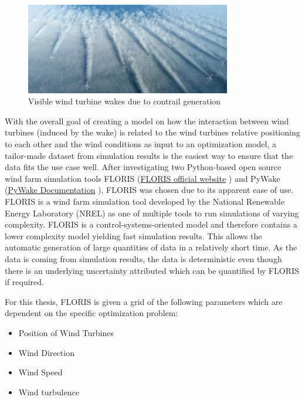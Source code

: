 \begin{figure}[h] 
	\centering
	\includegraphics[width=0.8\textwidth]{figures/introduction/wake_photo.png} 
	\caption{Visible wind turbine wakes due to contrail generation \cite{windpowermonthly_offshore_clusters}}
	\label{fig:wake_photo}
\end{figure}


With the overall goal of creating a model on how the interaction between wind turbines (induced by the wake) is related to the wind turbines relative positioning to each other and the wind conditions as input to an optimization model, a tailor-made dataset from simulation results is the easiest way to ensure that the data fits the use case well. After investigating two Python-based open source wind farm simulation tools FLORIS (\href{https://www.nrel.gov/wind/floris}{FLORIS official website} \cite{nrel_floris_web}) and PyWake (\href{https://topfarm.pages.windenergy.dtu.dk/PyWake/}{PyWake Documentation} \cite{dtu_pywake_2025}), FLORIS was chosen due to its apparent ease of use. FLORIS is a wind farm simulation tool developed by the National Renewable Energy Laboratory (NREL) as one of multiple tools to run simulations of varying complexity. FLORIS is a control-systems-oriented model and therefore contains a lower complexity model yielding fast simulation results. This allows the automatic generation of large quantities of data in a relatively short time. As the data is coming from  simulation results, the data is deterministic even though there is an underlying uncertainty attributed which can be quantified by FLORIS if required. 

For this thesis, FLORIS is given a grid of the following parameters which are dependent on the specific optimization problem:

\begin{itemize}
	\item Position of Wind Turbines
	\item Wind Direction
	\item Wind Speed
	\item Wind turbulence
\end{itemize}

